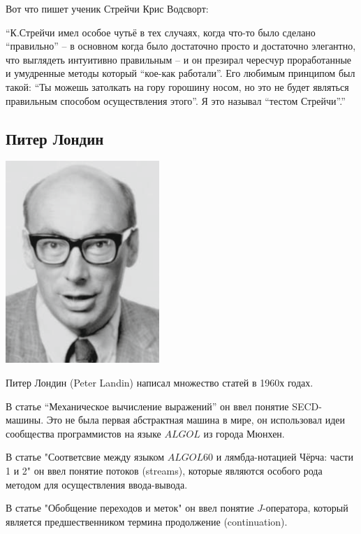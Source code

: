 \documentclass[14pt]{matmex-diploma-custom}
\begin{document}
\begin{framed}
Вот что пишет ученик Стрейчи Крис Водсворт:

“К.Стрейчи имел особое чутьё в тех случаях, когда что-то было сделано “правильно” -- в основном когда было достаточно просто и достаточно элегантно, что выглядеть интуитивно правильным -- и он презирал чересчур проработанные и умудренные методы который “кое-как работали”. Его любимым принципом был такой: “Ты можешь затолкать на гору горошину носом, но это не будет являться правильным способом осуществления этого”. Я это называл “тестом Стрейчи”.”
\end{framed}

\subsection{Питер Лондин}
\includegraphics[angle=0,scale=0.585]{220px-Peter_Landin.png}

Питер Лондин (Peter Landin) написал множество статей в 1960х годах.

В статье “Механическое вычисление выражений”\cite{laundin1} он ввел понятие SECD-машины. Это не была первая абстрактная машина в мире, он использовал идеи сообщества программистов на языке $ALGOL$ из города Мюнхен. 

В статье "Соответсвие между языком $ALGOL60$ и лямбда-нотацией Чёрча: части 1 и 2"\cite{laundin2} он ввел понятие потоков (streams), которые являются особого рода методом для осуществления ввода-вывода.

В статье "Обобщение переходов и меток" \cite{laundin3} он ввел понятие $J$-оператора, который является предшественником термина продолжение (continuation).
\end{document}
